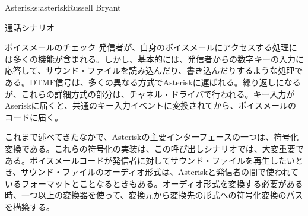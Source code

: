 \begin{aosachapter}{Asterisk}{s:asterisk}{Russell Bryant}
\begin{aosasect1}{通話シナリオ}
\begin{aosasect2}{ボイスメールのチェック}
発信者が、自身のボイスメールにアクセスする処理には多くの機能が含まれる。しかし、基本的には、発信者からの数字キーの入力に応答して、サウンド・ファイルを読み込んだり、書き込んだりするような処理である。DTMF信号は、多くの異なる方式でAsteriskに運ばれる。繰り返しになるが、これらの詳細方式の部分は、チャネル・ドライバで行われる。キー入力がAseriskに届くと、共通のキー入力イベントに変換されてから、ボイスメールのコードに届く。

これまで述べてきたなかで、Asteriskの主要インターフェースの一つは、符号化変換である。これらの符号化の実装は、この呼び出しシナリオでは、大変重要である。ボイスメールコードが発信者に対してサウンド・ファイルを再生したいとき、サウンド・ファイルのオーディオ形式は、Asteriskと発信者の間で使われているフォーマットとことなるときもある。オーディオ形式を変換する必要がある時、一つ以上の変換器を使って、変換元から変換先の形式への符号化変換のパスを構築する。



\end{aosasect2}
\end{aosasect1}
\end{aosachapter}

